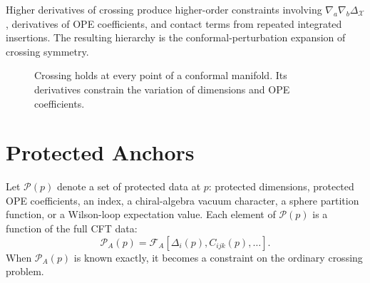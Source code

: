 Higher derivatives of crossing produce higher-order constraints involving
\(\nabla_a\nabla_b\Delta_{\mathcal X}\), derivatives of OPE coefficients, and
contact terms from repeated integrated insertions.  The resulting hierarchy is
the conformal-perturbation expansion of crossing symmetry.

\begin{figure}[H]
  \centering
  \caption{Crossing holds at every point of a conformal manifold.  Its
  derivatives constrain the variation of dimensions and OPE coefficients.}
  \label{fig:crossing-differentiated-on-manifold}
\end{figure}

\section{Protected Anchors}

Let \(\mathcal P(p)\) denote a set of protected data at \(p\): protected
dimensions, protected OPE coefficients, an index, a chiral-algebra vacuum
character, a sphere partition function, or a Wilson-loop expectation value.
Each element of \(\mathcal P(p)\) is a function of the full CFT data:
\[
  \mathcal P_A(p)
  =
  \mathcal F_A\!\left[
    \Delta_i(p),C_{ijk}(p),\ldots
  \right].
\]
When \(\mathcal P_A(p)\) is known exactly, it becomes a constraint on the
ordinary crossing problem.

